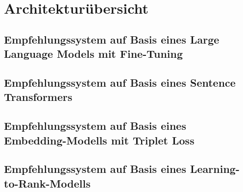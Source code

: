 
\chapter{Architekturübersicht}\label{chap:architektur}

\section{Empfehlungssystem auf Basis eines Large Language Models mit Fine-Tuning} 

\section{Empfehlungssystem auf Basis eines Sentence Transformers}

\section{Empfehlungssystem auf Basis eines Embedding-Modells mit Triplet Loss}

\section{Empfehlungssystem auf Basis eines Learning-to-Rank-Modells}